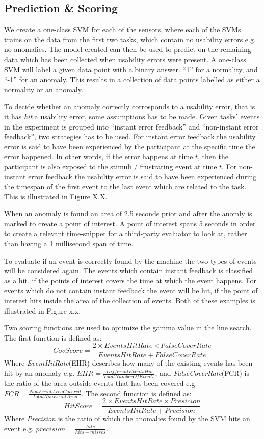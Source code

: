 \subsection{Prediction \& Scoring}
We create a one-class SVM for each of the sensors, where each of the SVMs trains on the data from the first two tasks, which contain no usability errors e.g. no anomalies. The model created can then be used to predict on the remaining data which has been collected when usability errors were present.
A one-class SVM will label a given data point with a binary answer. ``1'' for a normality, and ``-1'' for an anomaly.
This results in a collection of data points labelled as either a normality or an anomaly.

To decide whether an anomaly correctly corrosponds to a usability error, that is it has \textit{hit} a usability error, some assumptions has to be made. 
Given tasks' events in the experiment is grouped into ``instant error feedback'' and ``non-instant error feedback'', two strategies has to be used. 
For instant error feedback the usability error is said to have been experienced by the participant at the specific time the error happened. In other words, if the error happens at time $t$, then the participant is also exposed to the stimuli / frustrating event at time $t$.
For non-instant error feedback the usability error is said to have been experienced during the timespan of the first event to the last event which are related to the task. This is illustrated in Figure X.X. 

When an anomaly is found an area of 2.5 seconds prior and after the anomly is marked to create a point of interest. 
A point of interest spans 5 seconds in order to create a relevant time-snippet for a third-party evaluator to look at, rather than having a 1 millisecond span of time.

To evaluate if an event is correctly found by the machine the two types of events will be considered again.
The events which contain instant feedback is classified as a hit, if the points of interest covers the time at which the event happens.
For events which do not contain instant feedback the event will be hit, if the point of interest hits inside the area of the collection of events. Both of these examples is illustrated in Figure x.x. 

Two scoring functions are used to optimize the gamma value in the line search. The first function is defined as: 
\[CovScore = \frac{2 \times EventsHitRate \times FalseCoverRate}{EventsHitRate + FalseCoverRate}\]
Where \textit{EventHitRate}(EHR) describes how many of the existing events has been hit by an anomaly e.g. $EHR = \frac{DifferentEventsHit}{TotalNumberOfEvents}$, and \textit{FalseCoverRate}(FCR) is the ratio of the area outside events that has been covered e.g $FCR = \frac{NonEventAreaCovered}{TotalNonEventArea}$. 
The second function is defined as: 
\[HitScore = \frac{2 \times EventsHitRate \times Presicion}{EventsHitRate + Precision}\]
Where \textit{Precision} is the ratio of which the anomalies found by the SVM hits an event e.g. $precision = \frac{hits}{hits+misses}$. 

